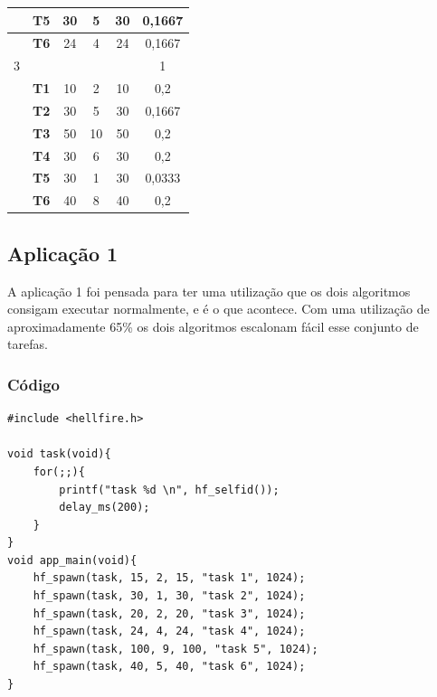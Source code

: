 \documentclass[12pt]{article}
\begin{document}
\begin{table}[h]
\begin{tabular}{|c|c|c|c|c|c|}
                   & \textbf{T5}                          & 30               & 5                   & 30                & 0,1667              \\ \hline
                   & \textbf{T6}                          & 24               & 4                   & 24                & 0,1667              \\ \hline
3                  &                                      &                  &                     &                   & 1                   \\ \hline
                   & \textbf{T1}                          & 10               & 2                   & 10                & 0,2                 \\ \hline
                   & \textbf{T2}                          & 30               & 5                   & 30                & 0,1667              \\ \hline
                   & \textbf{T3}                          & 50               & 10                  & 50                & 0,2                 \\ \hline
                   & \textbf{T4}                          & 30               & 6                   & 30                & 0,2                 \\ \hline
                   & \textbf{T5}                          & 30               & 1                   & 30                & 0,0333              \\ \hline
                   & \textbf{T6}                          & 40               & 8                   & 40                & 0,2                 \\ \hline
\end{tabular}
\end{table}


\subsection{Aplicação 1}
A aplicação 1 foi pensada para ter uma utilização que os dois algoritmos consigam executar normalmente, e é o que acontece. Com uma utilização de aproximadamente 65\% os dois algoritmos escalonam fácil esse conjunto de tarefas.
 
\subsubsection{Código} 
\begin{lstlisting}[showstringspaces=false]
#include <hellfire.h>

void task(void){
	for(;;){
		printf("task %d \n", hf_selfid());		
		delay_ms(200);
	}
}
void app_main(void){
	hf_spawn(task, 15, 2, 15, "task 1", 1024);
	hf_spawn(task, 30, 1, 30, "task 2", 1024);
	hf_spawn(task, 20, 2, 20, "task 3", 1024);
	hf_spawn(task, 24, 4, 24, "task 4", 1024);
	hf_spawn(task, 100, 9, 100, "task 5", 1024);
	hf_spawn(task, 40, 5, 40, "task 6", 1024);
}
\end{lstlisting}
\end{document}
